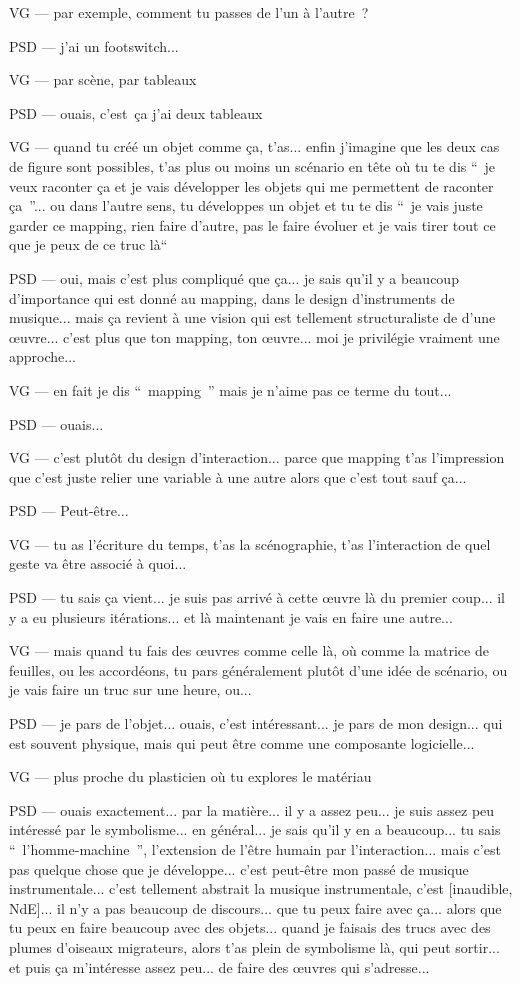 VG — par exemple, comment tu passes de l'un à l'autre ?

PSD — j'ai un footswitch...

VG — par scène, par tableaux

PSD — ouais, c'est ça j'ai deux tableaux

VG — quand tu créé un objet comme ça, t'as... enfin j'imagine que les deux cas de figure sont possibles, t'as plus ou moins un scénario en tête où tu te dis “ je veux raconter ça et je vais développer les objets qui me permettent de raconter ça ”... ou dans l'autre sens, tu développes un objet et tu te dis “ je vais juste garder ce mapping, rien faire d'autre, pas le faire évoluer et je vais tirer tout ce que je peux de ce truc là“ 

PSD — oui, mais c'est plus compliqué que ça... je sais qu'il y a beaucoup d'importance qui est donné au mapping, dans le design d'instruments de musique... mais ça revient à une vision qui est tellement structuraliste de d'une œuvre... c'est plus que ton mapping, ton œuvre... moi je privilégie vraiment une approche...

VG — en fait je dis “ mapping ” mais je n'aime pas ce terme du tout...

PSD — ouais... 

VG — c'est plutôt du design d'interaction... parce que mapping t'as l'impression que c'est juste relier une variable à une autre alors que c'est tout sauf ça...

PSD — Peut-être...

VG — tu as l'écriture du temps, t'as la scénographie, t'as l'interaction de quel geste va être associé à quoi...

PSD — tu sais ça vient... je suis pas arrivé à cette œuvre là du premier coup... il y a eu plusieurs itérations... et là maintenant je vais en faire une autre...

VG — mais quand tu fais des œuvres comme celle là, où comme la matrice de feuilles, ou les accordéons, tu pars généralement plutôt d'une idée de scénario, ou je vais faire un truc sur une heure, ou...

PSD — je pars de l'objet... ouais, c'est intéressant... je pars de mon design... qui est souvent physique, mais qui peut être comme une composante logicielle...

VG — plus proche du plasticien où tu explores le matériau

PSD — ouais exactement... par la matière... il y a assez peu... je suis assez peu intéressé par le symbolisme... en général... je sais qu'il y en a beaucoup... tu sais “ l'homme-machine ”,  l'extension de l'être humain par l'interaction... mais c'est pas quelque chose que je développe... c'est peut-être mon passé de musique instrumentale... c'est tellement abstrait la musique instrumentale, c'est [inaudible, NdE]... il n'y a pas beaucoup de discours... que tu peux faire avec ça... alors que tu peux en faire beaucoup avec des objets... quand je faisais des trucs avec des plumes d'oiseaux migrateurs, alors t'as plein de symbolisme là, qui peut sortir... et puis ça m'intéresse assez peu... de faire des œuvres qui s'adresse...

